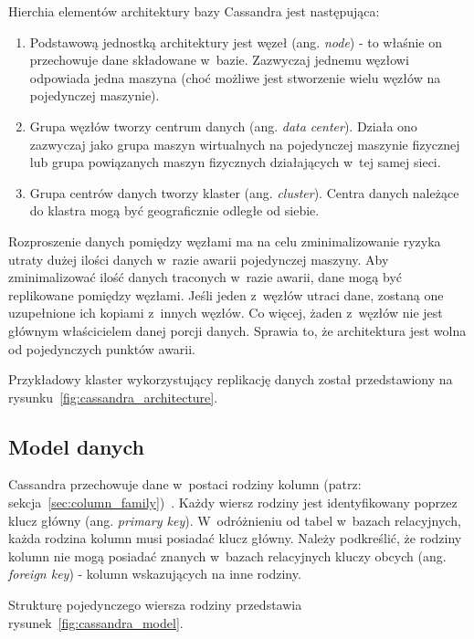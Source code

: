 Hierchia elementów architektury bazy Cassandra jest następująca:

\begin{enumerate}
 \item Podstawową jednostką architektury jest węzeł (ang. \emph{node}) - to właśnie on przechowuje dane składowane w~bazie.
 Zazwyczaj jednemu węzłowi odpowiada jedna maszyna (choć możliwe jest stworzenie wielu węzłów na pojedynczej maszynie).
 \item Grupa węzłów tworzy centrum danych (ang. \emph{data center}).
 Działa ono zazwyczaj jako grupa maszyn wirtualnych na pojedynczej maszynie fizycznej lub grupa powiązanych maszyn fizycznych działających w~tej samej sieci.
 \item Grupa centrów danych tworzy klaster (ang. \emph{cluster}).
 Centra danych należące do klastra mogą być geograficznie odległe od siebie.
\end{enumerate}

Rozproszenie danych pomiędzy węzłami ma na celu zminimalizowanie ryzyka utraty dużej ilości danych w~razie awarii pojedynczej maszyny.
Aby zminimalizować ilość danych traconych w~razie awarii, dane mogą być replikowane pomiędzy węzłami.
Jeśli jeden z~węzłów utraci dane, zostaną one uzupełnione ich kopiami z~innych węzłów.
Co więcej, żaden z~węzłów nie jest głównym właścicielem danej porcji danych.
Sprawia to, że architektura jest wolna od pojedynczych punktów awarii.

Przykładowy klaster wykorzystujący replikację danych został przedstawiony na rysunku~\ref{fig:cassandra_architecture}.




\subsection{Model danych}

Cassandra przechowuje dane w~postaci rodziny kolumn (patrz: sekcja~\ref{sec:column_family})~\cite{cassandra_model}.
Każdy wiersz rodziny jest identyfikowany poprzez klucz główny (ang. \emph{primary key}).
W~odróżnieniu od tabel w~bazach relacyjnych, każda rodzina kolumn musi posiadać klucz główny.
Należy podkreślić, że rodziny kolumn nie mogą posiadać znanych w~bazach relacyjnych kluczy obcych (ang. \emph{foreign key}) - kolumn wskazujących na inne rodziny.

Strukturę pojedynczego wiersza rodziny przedstawia rysunek~\ref{fig:cassandra_model}.

